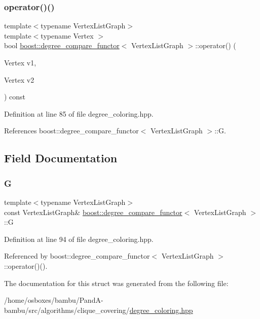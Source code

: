 \subsubsection{\texorpdfstring{operator()()}{operator()()}}
{\footnotesize\ttfamily template$<$typename Vertex\+List\+Graph$>$ \\
template$<$typename Vertex $>$ \\
bool \hyperlink{structboost_1_1degree__compare__functor}{boost\+::degree\+\_\+compare\+\_\+functor}$<$ Vertex\+List\+Graph $>$\+::operator() (\begin{DoxyParamCaption}\item[{Vertex}]{v1,  }\item[{Vertex}]{v2 }\end{DoxyParamCaption}) const\hspace{0.3cm}{\ttfamily [inline]}}



Definition at line 85 of file degree\+\_\+coloring.\+hpp.



References boost\+::degree\+\_\+compare\+\_\+functor$<$ Vertex\+List\+Graph $>$\+::G.



\subsection{Field Documentation}
\mbox{\label{structboost_1_1degree__compare__functor_a19f2346226e01fb5c3b0c6d3779303e5}} 
\subsubsection{\texorpdfstring{G}{G}}
{\footnotesize\ttfamily template$<$typename Vertex\+List\+Graph$>$ \\
const Vertex\+List\+Graph\& \hyperlink{structboost_1_1degree__compare__functor}{boost\+::degree\+\_\+compare\+\_\+functor}$<$ Vertex\+List\+Graph $>$\+::G\hspace{0.3cm}{\ttfamily [private]}}



Definition at line 94 of file degree\+\_\+coloring.\+hpp.



Referenced by boost\+::degree\+\_\+compare\+\_\+functor$<$ Vertex\+List\+Graph $>$\+::operator()().



The documentation for this struct was generated from the following file\+:\begin{DoxyCompactItemize}
\item 
/home/osboxes/bambu/\+Pand\+A-\/bambu/src/algorithms/clique\+\_\+covering/\hyperlink{degree__coloring_8hpp}{degree\+\_\+coloring.\+hpp}\end{DoxyCompactItemize}
